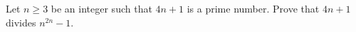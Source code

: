 Let $n \ge 3$ be an integer such that $4n+1$ is a prime number. Prove that $4n+1$ divides $n^{2n}-1$.
